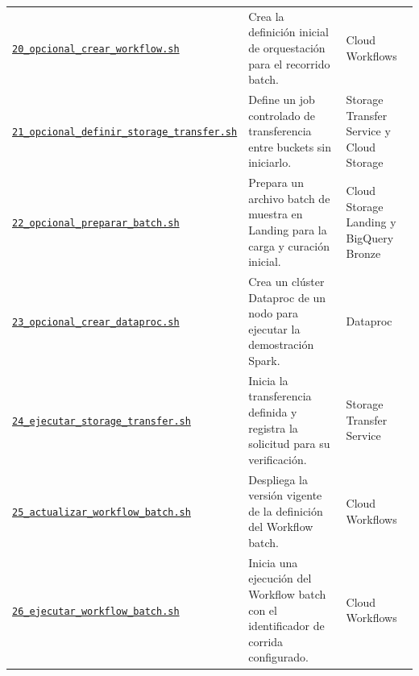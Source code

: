 \documentclass[11pt]{article}
\begin{document}
\begin{longtable}{@{}>{\raggedright\arraybackslash}p{}>{\raggedright\arraybackslash}p{}>{\raggedright\arraybackslash}p{}@{}}
\href{https://github.com/Codenid/lumina-retail-data-platform/blob/main/implementation/automatizacion/scripts20_opcional_crear_workflow.sh}{\texttt{20\_\allowbreak{}opcional\_\allowbreak{}crear\_\allowbreak{}workflow.sh}} & Crea la definición inicial de orquestación para el recorrido batch. & Cloud Workflows \\
\href{https://github.com/Codenid/lumina-retail-data-platform/blob/main/implementation/automatizacion/scripts21_opcional_definir_storage_transfer.sh}{\texttt{21\_\allowbreak{}opcional\_\allowbreak{}definir\_\allowbreak{}storage\_\allowbreak{}transfer.sh}} & Define un job controlado de transferencia entre buckets sin iniciarlo. & Storage Transfer Service y Cloud Storage \\
\href{https://github.com/Codenid/lumina-retail-data-platform/blob/main/implementation/automatizacion/scripts22_opcional_preparar_batch.sh}{\texttt{22\_\allowbreak{}opcional\_\allowbreak{}preparar\_\allowbreak{}batch.sh}} & Prepara un archivo batch de muestra en Landing para la carga y curación inicial. & Cloud Storage Landing y BigQuery Bronze \\
\href{https://github.com/Codenid/lumina-retail-data-platform/blob/main/implementation/automatizacion/scripts23_opcional_crear_dataproc.sh}{\texttt{23\_\allowbreak{}opcional\_\allowbreak{}crear\_\allowbreak{}dataproc.sh}} & Crea un clúster Dataproc de un nodo para ejecutar la demostración Spark. & Dataproc \\
\href{https://github.com/Codenid/lumina-retail-data-platform/blob/main/implementation/automatizacion/scripts24_ejecutar_storage_transfer.sh}{\texttt{24\_\allowbreak{}ejecutar\_\allowbreak{}storage\_\allowbreak{}transfer.sh}} & Inicia la transferencia definida y registra la solicitud para su verificación. & Storage Transfer Service \\
\href{https://github.com/Codenid/lumina-retail-data-platform/blob/main/implementation/automatizacion/scripts25_actualizar_workflow_batch.sh}{\texttt{25\_\allowbreak{}actualizar\_\allowbreak{}workflow\_\allowbreak{}batch.sh}} & Despliega la versión vigente de la definición del Workflow batch. & Cloud Workflows \\
\href{https://github.com/Codenid/lumina-retail-data-platform/blob/main/implementation/automatizacion/scripts26_ejecutar_workflow_batch.sh}{\texttt{26\_\allowbreak{}ejecutar\_\allowbreak{}workflow\_\allowbreak{}batch.sh}} & Inicia una ejecución del Workflow batch con el identificador de corrida configurado. & Cloud Workflows \\

\end{longtable}
\end{document}
